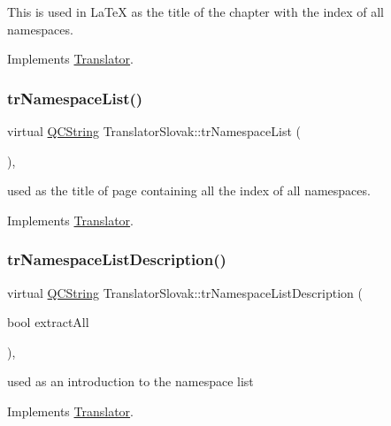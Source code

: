 This is used in La\+TeX as the title of the chapter with the index of all namespaces. 

Implements \mbox{\hyperlink{class_translator}{Translator}}.

\mbox{\label{class_translator_slovak_ae10aa54dde6d64858e4c0492672cb2f4}} 
\subsubsection{\texorpdfstring{trNamespaceList()}{trNamespaceList()}}
{\footnotesize\ttfamily virtual \mbox{\hyperlink{class_q_c_string}{Q\+C\+String}} Translator\+Slovak\+::tr\+Namespace\+List (\begin{DoxyParamCaption}{ }\end{DoxyParamCaption})\hspace{0.3cm}{\ttfamily [inline]}, {\ttfamily [virtual]}}

used as the title of page containing all the index of all namespaces. 

Implements \mbox{\hyperlink{class_translator}{Translator}}.

\mbox{\label{class_translator_slovak_adf58336bb354de960989d978ad3eb6f3}} 
\subsubsection{\texorpdfstring{trNamespaceListDescription()}{trNamespaceListDescription()}}
{\footnotesize\ttfamily virtual \mbox{\hyperlink{class_q_c_string}{Q\+C\+String}} Translator\+Slovak\+::tr\+Namespace\+List\+Description (\begin{DoxyParamCaption}\item[{bool}]{extract\+All }\end{DoxyParamCaption})\hspace{0.3cm}{\ttfamily [inline]}, {\ttfamily [virtual]}}

used as an introduction to the namespace list 

Implements \mbox{\hyperlink{class_translator}{Translator}}.

